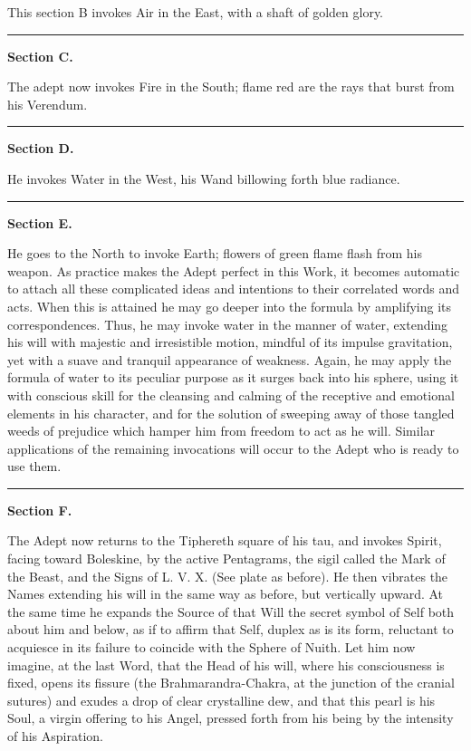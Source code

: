 This section B invokes Air in the East, with a shaft of golden glory.


{\centering
\rule{1in}{0.5pt}
\par}

\pagebreak[1]
\textbf{Section C.}


The adept now invokes Fire in the South; flame red are the rays that burst from his Verendum.


{\centering
\rule{1in}{0.5pt}
\par}

\pagebreak[1]
\textbf{Section D.}


He invokes Water in the West, his Wand billowing forth blue radiance.


{\centering
\rule{1in}{0.5pt}
\par}

\pagebreak[1]
\textbf{Section E.}


He goes to the North to invoke Earth; flowers of green flame flash from his weapon. As practice makes the Adept perfect in this Work, it becomes automatic to attach all these complicated ideas and intentions to their correlated words and acts. When this is attained he may go deeper into the formula by amplifying its correspondences. Thus, he may invoke water in the manner of water, extending his will with majestic and irresistible motion, mindful of its impulse gravitation, yet with a suave and tranquil appearance of weakness. Again, he may apply the formula of water to its peculiar purpose as it surges back into his sphere, using it with conscious skill for the cleansing and calming of the receptive and emotional elements in his character, and for the solution of sweeping away of those tangled weeds of prejudice which hamper him from freedom to act as he will. Similar applications of the remaining invocations will occur to the Adept who is ready to use them.


{\centering
\rule{1in}{0.5pt}
\par}

\pagebreak[1]
\textbf{Section F.}


The Adept now returns to the Tiphereth square of his tau, and invokes Spirit, facing toward Boleskine, by the active Pentagrams, the sigil called the Mark of the Beast, and the Signs of L.\nolinebreak{} V.\nolinebreak{} X.\nolinebreak{}  (See plate as before). He then vibrates the Names extending his will in the same way as before, but vertically upward. At the same time he expands the Source of that Will \textemdash{} the secret symbol of Self \textemdash{} both about him and below, as if to affirm that Self, duplex as is its form, reluctant to acquiesce in its failure to coincide with the Sphere of Nuith. Let him now imagine, at the last Word, that the Head of his will, where his consciousness is fixed, opens its fissure (the Brahmarandra-Chakra, at the junction of the cranial sutures) and exudes a drop of clear crystalline dew, and that this pearl is his Soul, a virgin offering to his Angel, pressed forth from his being by the intensity of his Aspiration.


